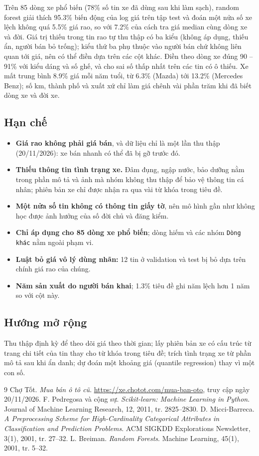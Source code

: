 Trên 85 dòng xe phổ biến (78\% số tin xe đã dùng sau khi làm sạch), random forest giải thích 95.3\% biến động của log
giá trên tập test và đoán một nửa số xe lệch không quá 5.5\% giá rao, so với 7.2\% của cách tra giá median cùng dòng
xe và đời. Giá trị thiếu trong tin rao tự thu thập có ba kiểu (không áp dụng, thiếu ẩn, người bán bỏ trống); kiểu thứ
ba phụ thuộc vào người bán chứ không liên quan tới giá, nên có thể điền dựa trên các cột khác. Điền theo dòng xe đúng
90 -- 91\% với kiểu dáng và số ghế, và cho sai số thấp nhất trên các tin có ô thiếu. Xe mất trung bình 8.9\% giá mỗi
năm tuổi, từ 6.3\% (Mazda) tới 13.2\% (Mercedes Benz); số km, thành phố và xuất xứ chỉ làm giá chênh vài phần trăm khi
đã biết dòng xe và đời xe.

\subsection*{Hạn chế}
\begin{itemize}
  \item \textbf{Giá rao không phải giá bán}, và dữ liệu chỉ là một lần thu thập (20/11/2026): xe bán nhanh có thể đã bị
        gỡ trước đó.
  \item \textbf{Thiếu thông tin tình trạng xe.} Đâm đụng, ngập nước, bảo dưỡng nằm trong phần mô tả và ảnh mà nhóm không
        thu thập để bảo vệ thông tin cá nhân; phiên bản xe chỉ được nhận ra qua vài từ khóa trong tiêu đề.
  \item \textbf{Một nửa số tin không có thông tin giấy tờ}, nên mô hình gần như không học được ảnh hưởng của số đời chủ
        và đăng kiểm.
  \item \textbf{Chỉ áp dụng cho 85 dòng xe phổ biến}; dòng hiếm và các nhóm \texttt{Dòng khác} nằm ngoài phạm vi.
  \item \textbf{Luật bỏ giá vô lý dùng nhãn:} 12 tin ở validation và test bị bỏ dựa trên chính giá rao của chúng.
  \item \textbf{Năm sản xuất do người bán khai}; 1.3\% tiêu đề ghi năm lệch hơn 1 năm so với cột này.
\end{itemize}

\subsection*{Hướng mở rộng}
Thu thập định kỳ để theo dõi giá theo thời gian; lấy phiên bản xe có cấu trúc từ trang chi tiết của tin thay cho từ khóa
trong tiêu đề; trích tình trạng xe từ phần mô tả sau khi ẩn danh; dự đoán một khoảng giá (quantile regression) thay vì
một con số.

\begin{thebibliography}{9}
 Chợ Tốt. \textit{Mua bán ô tô cũ}. \url{https://xe.chotot.com/mua-ban-oto}, truy cập ngày
  20/11/2026.
 F. Pedregosa và cộng sự. \textit{Scikit-learn: Machine Learning in Python}. Journal of Machine
  Learning Research, 12, 2011, tr. 2825--2830.
 D. Micci-Barreca. \textit{A Preprocessing Scheme for High-Cardinality Categorical Attributes in
  Classification and Prediction Problems}. ACM SIGKDD Explorations Newsletter, 3(1), 2001, tr. 27--32.
 L. Breiman. \textit{Random Forests}. Machine Learning, 45(1), 2001, tr. 5--32.
\end{thebibliography}
